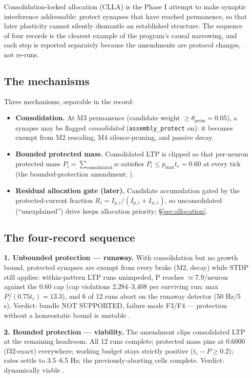 Consolidation-locked allocation (CLLA) is the Phase I attempt to make
synaptic interference addressable: protect synapses that have reached
permanence, so that later plasticity cannot silently dismantle an
established structure. The sequence of four records is the clearest
example of the program's causal narrowing, and each step is reported
separately because the amendments are protocol changes, not re-runs.

\subsection{The mechanisms}

Three mechanisms, separable in the record:

\begin{itemize}
\item \textbf{Consolidation.} At M3 permanence (candidate weight
\(\ge \theta_{\mathrm{perm}}=0.05\)), a synapse may be flagged
\emph{consolidated} (\texttt{assembly\_protect} on): it becomes exempt
from M2 rescaling, M4 silence-pruning, and passive decay.
\item \textbf{Bounded protected mass.} Consolidated LTP is clipped so
that per-neuron protected mass \(P_i = \sum_{\text{consolidated}} w\)
satisfies \(P_i \le p_{\max} t_e = 0.60\) at every tick
(the bounded-protection amendment; \cite{bbounded}).
\item \textbf{Residual allocation gate (later).} Candidate
accumulation gated by the protected-current fraction
\(R_i = I_{p,i}/(I_{p,i} + I_{w,i})\), so unconsolidated (``unexplained'')
drive keeps allocation priority; \S\ref{sec:allocation}.
\end{itemize}

\subsection{The four-record sequence}

\textbf{1. Unbounded protection --- runaway.} With consolidation but no
growth bound, protected synapses are exempt from every brake (M2,
decay) while STDP still applies: within-pattern LTP runs unimpeded, P
reaches \(\approx 7.9\)/neuron against the 0.60 cap (cap violations
2{,}284--3{,}408 per surviving run; max \(P/(0.75t_e) = 13.3\)), and 6
of 12 runs abort on the runaway detector (50 Hz/5 s). Verdict:
bundle NOT SUPPORTED, failure mode F3/F4 --- protection without a
homeostatic bound is unstable \cite{cllarecord}.

\textbf{2. Bounded protection --- viability.} The amendment clips
consolidated LTP at the remaining headroom. All 12 runs complete;
protected mass pins at 0.6000 (f32-exact) everywhere; working budget
stays strictly positive (\(t_e - P \ge 0.2\)); rates settle to
3.5--6.5 Hz; the previously-aborting cells complete. Verdict:
dynamically viable \cite{bbounded}.

